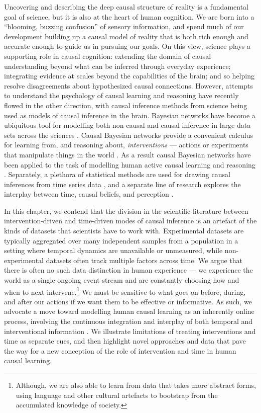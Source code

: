\documentclass{cambridge7A}%
\begin{document}
Uncovering and describing the deep causal structure of reality is a fundamental goal of science, but it is also at the heart of human cognition.  We are born into a ``blooming, buzzing confusion'' \citep[p. 462]{james1890principles} of sensory information, and spend much of our development building up a causal model of reality that is both rich enough and accurate enough to guide us in pursuing our goals. On this view, science plays a supporting role in causal cognition: extending the domain of causal understanding beyond what can be inferred through everyday experience; integrating evidence at scales beyond the capabilities of the brain; and so helping resolve disagreements about hypothesized causal connections.  However, attempts to understand the psychology of causal learning and reasoning have recently flowed in the other direction, with causal inference methods from science being used as models of causal inference in the brain. Bayesian networks have become a ubiquitous tool for modelling both non-causal and causal inference in large data sets across the sciences \citep{pearl1988probabilistic}.  Causal Bayesian networks provide a convenient calculus for learning from, and reasoning about, \emph{interventions} --- actions or experiments that manipulate things in the world \citep{pearl2000causality,woodward2003making}.  As a result causal Bayesian networks have been applied to the task of modelling human active causal learning and reasoning \citep{lagnado2002learning,bramley2015fcs,steyvers2003intervention,gopnik2004theory,sloman2005do}.  Separately, a plethora of statistical methods are used for drawing causal inferences from time series data \citep{friston2014granger,granger2004time}, and a separate line of research explores the interplay between time, causal beliefs, and perception \citep[e.g.,][]{buehner2006temporal,bechlivanidis2016time}.

In this chapter, we contend that the division in the scientific literature between intervention-driven and time-driven modes of causal inference is an artefact of the kinds of datasets that scientists have to work with.  Experimental datasets are typically aggregated over many independent samples from a population in a setting where temporal dynamics are unavailable or unmeasured, while non-experimental datasets often track multiple factors across time.  We argue that there is often no such data distinction in human experience --- we experience the world as a single ongoing event stream and are constantly choosing how and when to next intervene.\footnote{Although, we are also able to learn from data that takes more abstract forms, using language and other cultural artefacts to bootstrap from the accumulated knowledge of society.} We must be sensitive to what goes on before, during, and after our actions if we want them to be effective or informative.  As such, we advocate a move toward modelling human causal learning as an inherently online process, involving the continuous integration and interplay of both temporal and interventional information \citep[cf][]{rottman2014children}.  We illustrate limitations of treating interventions and time as separate cues, and then highlight novel approaches and data that pave the way for a new conception of the role of intervention and time in human causal learning.
\end{document}
